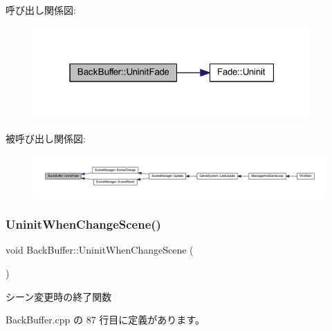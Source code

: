 呼び出し関係図\+:
\nopagebreak
\begin{figure}[H]
\begin{center}
\leavevmode
\includegraphics[width=301pt]{class_back_buffer_ad3d3626427f53f060f5057ea6a22cac6_cgraph}
\end{center}
\end{figure}
被呼び出し関係図\+:
\nopagebreak
\begin{figure}[H]
\begin{center}
\leavevmode
\includegraphics[width=350pt]{class_back_buffer_ad3d3626427f53f060f5057ea6a22cac6_icgraph}
\end{center}
\end{figure}
\mbox{\label{class_back_buffer_a989c5474cabde7f88c197a2a235e8424}} 
\subsubsection{\texorpdfstring{Uninit\+When\+Change\+Scene()}{UninitWhenChangeScene()}}
{\footnotesize\ttfamily void Back\+Buffer\+::\+Uninit\+When\+Change\+Scene (\begin{DoxyParamCaption}{ }\end{DoxyParamCaption})}



シーン変更時の終了関数 



 Back\+Buffer.\+cpp の 87 行目に定義があります。

